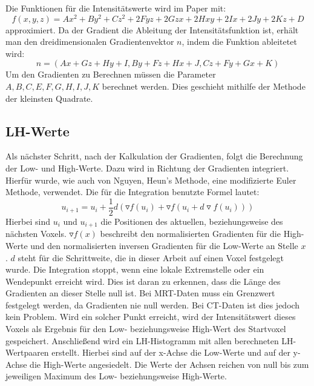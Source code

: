 Die Funktionen für die Intensitätswerte wird im Paper mit:
\begin{equation}
	f(x,y,z) = Ax^{2}+By^{2}+Cz^{2}+2Fyz+2Gzx+2Hxy+2Ix+2Jy+2Kz+D
\end{equation}
approximiert. Da der Gradient die Ableitung der Intensitätsfunktion ist, erhält man den dreidimensionalen Gradientenvektor $n$, indem die Funktion ableitetet wird:
\begin{equation}
	n = (Ax+Gz+Hy+I, By+Fz+Hx+J, Cz + Fy + Gx + K)
\end{equation}
Um den Gradienten zu Berechnen müssen die Parameter $A,B,C,E,F,G,H,I,J,K$  berechnet werden. Dies geschieht mithilfe der Methode der kleinsten Quadrate.

\subsection{LH-Werte}

Als nächster Schritt, nach der Kalkulation der Gradienten, folgt die Berechnung der Low- und High-Werte. Dazu wird in Richtung der Gradienten integriert. Hierfür wurde, wie auch von Nguyen, Heun's Methode, eine modifizierte Euler Methode, verwendet. Die für die Integration benutzte Formel lautet:
\begin{equation}
	u_{i+1} = u_{i} + \frac{1}{2}d(\triangledown f (u_{i}) + \triangledown f(u_{i}+d \triangledown f(u_{i}))) 
\end{equation}
Hierbei sind $u_{i}$ und $u_{i+1}$ die Positionen des aktuellen, beziehungsweise des nächsten Voxels. $\triangledown f(x)$ beschreibt den normalisierten Gradienten für die High-Werte und den normalisierten inversen Gradienten für die Low-Werte an Stelle $x$ . $d$ steht für die Schrittweite, die in dieser Arbeit auf einen Voxel festgelegt wurde.
Die Integration stoppt, wenn eine lokale Extremstelle oder ein Wendepunkt erreicht wird. Dies ist daran zu erkennen, dass die Länge des Gradienten an dieser Stelle null ist. Bei MRT-Daten muss ein Grenzwert festgelegt werden, da Gradienten nie null werden. Bei CT-Daten ist dies jedoch kein Problem. Wird ein solcher Punkt erreicht, wird der Intensitätswert dieses Voxels als Ergebnis für den Low- beziehungsweise High-Wert des Startvoxel gespeichert.
\newline
Anschließend wird ein LH-Histogramm mit allen berechneten LH-Wertpaaren erstellt. Hierbei sind auf der x-Achse die Low-Werte und auf der y-Achse die High-Werte angesiedelt. Die Werte der Achsen reichen von null bis zum jeweiligen Maximum des Low- beziehungsweise High-Werte.

